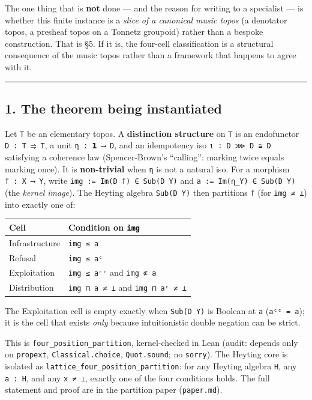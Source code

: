 \documentclass[
  11pt,
]{article}
\newcounter{none} %
\begin{document}
The one thing that is \textbf{not} done --- and the reason for writing
to a specialist --- is whether this finite instance is a \emph{slice of
a canonical music topos} (a denotator topos, a presheaf topos on a
Tonnetz groupoid) rather than a bespoke construction. That is §5. If it
is, the four-cell classification is a structural consequence of the
music topos rather than a framework that happens to agree with it.

\begin{center}\rule{0.5\linewidth}{0.5pt}\end{center}

\subsection{1. The theorem being
instantiated}\label{the-theorem-being-instantiated}

Let \texttt{T} be an elementary topos. A \textbf{distinction structure}
on \texttt{T} is an endofunctor \texttt{D\ :\ T\ ⥤\ T}, a unit
\texttt{η\ :\ 𝟭\ ⟶\ D}, and an idempotency iso
\texttt{ι\ :\ D\ ⋙\ D\ ≅\ D} satisfying a coherence law (Spencer-Brown's
``calling'': marking twice equals marking once). It is
\textbf{non-trivial} when \texttt{η} is not a natural iso. For a
morphism \texttt{f\ :\ X\ ⟶\ Y}, write
\texttt{img\ :=\ Im(D\ f)\ ∈\ Sub(D\ Y)} and
\texttt{a\ :=\ Im(η\_Y)\ ∈\ Sub(D\ Y)} (the \emph{kernel image}). The
Heyting algebra \texttt{Sub(D\ Y)} then partitions \texttt{f} (for
\texttt{img\ ≠\ ⊥}) into exactly one of:

{\def\LTcaptype{none} %
\begin{longtable}[]{@{}ll@{}}
\toprule\noalign{}
Cell & Condition on \texttt{img} \\
\midrule\noalign{}
\endhead
\bottomrule\noalign{}
\endlastfoot
Infrastructure & \texttt{img\ ≤\ a} \\
Refusal & \texttt{img\ ≤\ aᶜ} \\
Exploitation & \texttt{img\ ≤\ aᶜᶜ} and \texttt{img\ ⊄\ a} \\
Distribution & \texttt{img\ ⊓\ a\ ≠\ ⊥} and \texttt{img\ ⊓\ aᶜ\ ≠\ ⊥} \\
\end{longtable}
}

The Exploitation cell is empty exactly when \texttt{Sub(D\ Y)} is
Boolean at \texttt{a} (\texttt{aᶜᶜ\ =\ a}); it is the cell that exists
\emph{only} because intuitionistic double negation can be strict.

This is \texttt{four\_position\_partition}, kernel-checked in Lean
(audit: depends only on \texttt{propext}, \texttt{Classical.choice},
\texttt{Quot.sound}; no \texttt{sorry}). The Heyting core is isolated as
\texttt{lattice\_four\_position\_partition}: for any Heyting algebra
\texttt{H}, any \texttt{a\ :\ H}, and any \texttt{x\ ≠\ ⊥}, exactly one
of the four conditions holds. The full statement and proof are in the
partition paper (\texttt{paper.md}).
\end{document}
